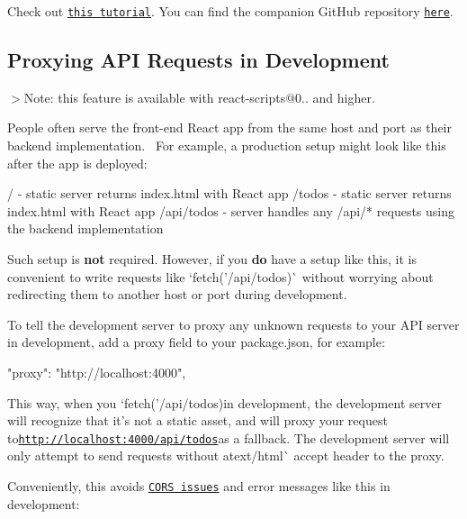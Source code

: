 Check out \href{https://www.fullstackreact.com/articles/how-to-get-create-react-app-to-work-with-your-rails-api/}{\tt this tutorial}. You can find the companion Git\+Hub repository \href{https://github.com/fullstackreact/food-lookup-demo-rails}{\tt here}.

\subsection*{Proxying A\+PI Requests in Development}

$>$Note\+: this feature is available with {\ttfamily react-\/scripts@0..} and higher.

People often serve the front-\/end React app from the same host and port as their backend implementation.~\newline
 For example, a production setup might look like this after the app is deployed\+:


\begin{DoxyCode}
/             - static server returns index.html with React app
/todos        - static server returns index.html with React app
/api/todos    - server handles any /api/* requests using the backend implementation
\end{DoxyCode}


Such setup is {\bfseries not} required. However, if you {\bfseries do} have a setup like this, it is convenient to write requests like `fetch('/api/todos\textquotesingle{})\`{} without worrying about redirecting them to another host or port during development.

To tell the development server to proxy any unknown requests to your A\+PI server in development, add a {\ttfamily proxy} field to your {\ttfamily package.\+json}, for example\+:


\begin{DoxyCode}
"proxy": "http://localhost:4000",
\end{DoxyCode}


This way, when you `fetch('/api/todos\textquotesingle{}){\ttfamily in development, the development server will recognize that it’s not a static asset, and will proxy your request to}\href{http://localhost:4000/api/todos}{\tt http\+://localhost\+:4000/api/todos}{\ttfamily as a fallback. The development server will only attempt to send requests without a}text/html\`{} accept header to the proxy.

Conveniently, this avoids \href{http://stackoverflow.com/questions/21854516/understanding-ajax-cors-and-security-considerations}{\tt C\+O\+RS issues} and error messages like this in development\+:


